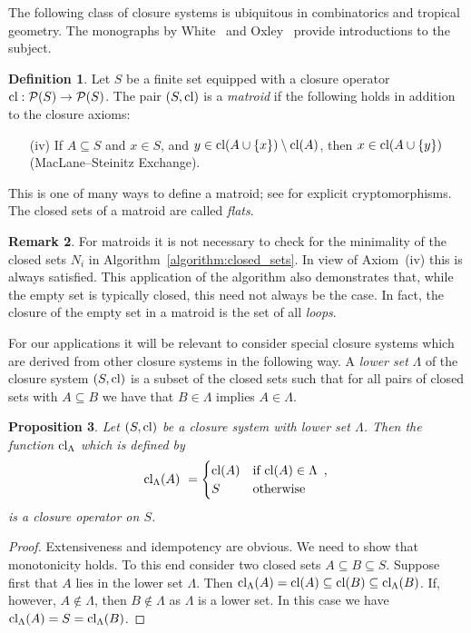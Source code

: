 \documentclass[11pt,a4paper]{amsart}
\theoremstyle{definition}
\newtheorem{definition}{Definition}[section]
\newtheorem{remark}[definition]{Remark}
\theoremstyle{plain}
\newtheorem{prop}[definition]{Proposition}
\begin{document}
The following class of closure systems is ubiquitous in combinatorics and tropical geometry.
The monographs by White~\cite{White:1986} and Oxley~\cite{Oxley:2011} provide introductions to the subject.
\begin{definition}\label{def:matroid}
  Let $S$ be a finite set equipped with a closure operator ${\textnormal{cl}}: \mathcal{P}(S) \to \mathcal{P}(S)$.
  The pair $(S,{\textnormal{cl}})$ is a \emph{matroid} if the following holds in addition to the closure axioms:
  \begin{enumerate}
  \item[(iv)] If $A\subseteq S$ and $x\in S$, and $y\in{\textnormal{cl}}(A\cup\{x\})\setminus{\textnormal{cl}}(A)$, then $x\in{\textnormal{cl}}(A\cup\{y\})$ (MacLane--Steinitz Exchange).
  \end{enumerate}
\end{definition}
This is one of many ways to define a matroid; see \cite[Lemma~1.4.3]{Oxley:2011} for explicit cryptomorphisms.
The closed sets of a matroid are called \emph{flats}.
\begin{remark}
  For matroids it is not necessary to check for the minimality of the closed sets $N_i$ in Algorithm~\ref{algorithm:closed_sets}.
  In view of Axiom~(iv) this is always satisfied. This application of the algorithm also demonstrates that, while the empty set is typically closed, this need not always be the case. In fact, the closure of the empty set in a matroid is the set of all \emph{loops}.
\end{remark}

For our applications it will be relevant to consider special closure systems which are derived from other closure systems in the following way.
A \emph{lower set} $\Lambda$ of the closure system $(S,{\textnormal{cl}})$ is a subset of the closed sets such that for all pairs of closed sets with $A\subseteq B$ we have that $B\in \Lambda$ implies $A\in \Lambda$.
\begin{prop}\label{prop:lower}
  Let $(S,{\textnormal{cl}})$ be a closure system with lower set $\Lambda$.
  Then the function ${\textnormal{cl}}_\Lambda$ which is defined by
  \begin{equation}\label{eq:cl_Lambda}
    {\textnormal{cl}}_\Lambda(A) \ = \begin{cases} {\textnormal{cl}}(A) & \text{if ${\textnormal{cl}}(A)\in\Lambda$} \enspace,\\ S & \text{otherwise} \end{cases}
  \end{equation}
  is a closure operator on $S$.
\end{prop}
\begin{proof}
  Extensiveness and idempotency are obvious.
  We need to show that monotonicity holds.
  To this end consider two closed sets $A\subseteq B\subseteq S$.
  Suppose first that $A$ lies in the lower set $\Lambda$.
  Then ${\textnormal{cl}}_\Lambda(A)={\textnormal{cl}}(A)\subseteq{\textnormal{cl}}(B)\subseteq{\textnormal{cl}}_\Lambda(B)$.
  If, however, $A\not\in\Lambda$, then $B\not\in\Lambda$ as $\Lambda$ is a lower set.
  In this case we have ${\textnormal{cl}}_\Lambda(A)=S={\textnormal{cl}}_\Lambda(B)$.
\end{proof}
\end{document}
